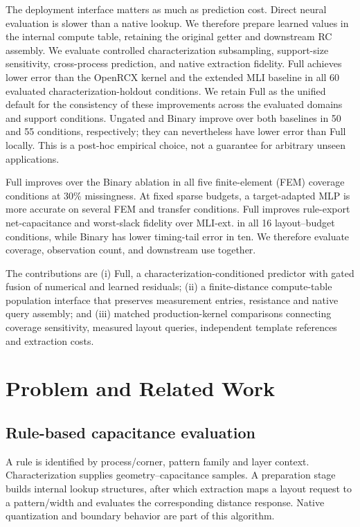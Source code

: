 \documentclass[conference,9pt,letterpaper]{IEEEtran}
\begin{document}
The deployment interface matters as much as prediction cost. Direct neural evaluation is slower than a native lookup. We therefore prepare learned values in the internal compute table, retaining the original getter and downstream RC assembly.
We evaluate controlled characterization subsampling, support-size sensitivity, cross-process prediction, and native extraction fidelity.
Full achieves lower error than the OpenRCX kernel and the extended MLI baseline in all 60 evaluated characterization-holdout conditions. We retain Full as the unified default for the consistency of these improvements across the evaluated domains and support conditions. Ungated and Binary improve over both baselines in 50 and 55 conditions, respectively; they can nevertheless have lower error than Full locally. This is a post-hoc empirical choice, not a guarantee for arbitrary unseen applications.

Full improves over the Binary ablation in all five finite-element (FEM) coverage conditions at 30\% missingness. At fixed sparse budgets, a target-adapted MLP is more accurate on several FEM and transfer conditions. Full improves rule-export net-capacitance
and worst-slack fidelity over MLI-ext. in all 16 layout–budget conditions, while Binary has lower timing-tail error in ten. We therefore evaluate coverage, observation count, and downstream use together.


The contributions are (i) Full, a characterization-conditioned predictor with gated fusion of numerical and learned residuals; (ii) a finite-distance compute-table population interface that preserves measurement entries, resistance and native query assembly; and (iii) matched production-kernel comparisons connecting coverage sensitivity, measured layout queries, independent template references and extraction costs.

\section{Problem and Related Work}
\subsection{Rule-based capacitance evaluation}
A rule is identified by process/corner, pattern family and layer context. Characterization supplies geometry--capacitance samples. A preparation stage builds internal lookup structures, after which extraction maps a layout request to a pattern/width and evaluates the corresponding distance response. Native quantization and boundary behavior are part of this algorithm.
\end{document}
